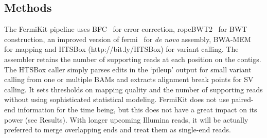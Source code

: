 \documentclass{bioinfo}
\begin{document}
\begin{methods}
\section{Methods}
The FermiKit pipeline uses BFC~\citep{Li:2015aa-tmp} for error correction,
ropeBWT2~\citep{Li:2014ab} for BWT construction, an improved version of
fermi~\citep{Li:2012fk} for {\it de novo} assembly, BWA-MEM~\citep{Li:2013aa}
for mapping and HTSBox (http://bit.ly/HTSBox) for variant calling. The
assembler retains the number of supporting reads at each position on the
contigs. The HTSBox caller simply parses edits in the `pileup' output for small
variant calling from one or multiple BAMs and extracts alignment break points
for SV calling. It sets thresholds on mapping quality and the number of
supporting reads without using sophisticated statistical modeling. FermiKit
does not use paired-end information for the time being, but this does not have
a great impact on its power (see Results). With longer upcoming Illumina reads,
it will be actually preferred to merge overlapping ends and treat them as
single-end reads.

\end{methods}
\end{document}

